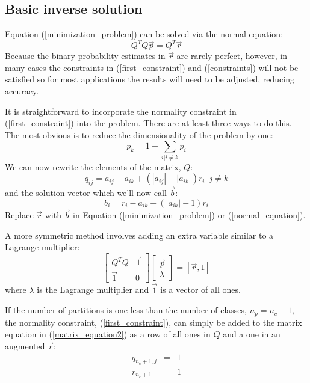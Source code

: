 \documentclass{article}
\begin{document}
\subsection{Basic inverse solution}

Equation (\ref{minimization_problem}) can be solved via the normal
equation:
\begin{equation}
	Q^T Q \vec p = Q^T \vec r
	\label{normal_equation}
\end{equation}
Because the binary probability estimates in $\vec r$ are rarely perfect, however,
in many cases the constraints in (\ref{first_constraint}) and (\ref{constraints}) will not be satisfied 
so for most applications the results will need to be adjusted, reducing accuracy.

It is straightforward to incorporate the normality constraint in (\ref{first_constraint}) into the problem. There are at least three ways to do this. The most
obvious is to reduce the dimensionality of the problem by one:
\begin{equation}
	p_k = 1 - \sum_{i|i \ne k} p_i
\end{equation}
We can now rewrite the elements of the matrix, $Q$:
\begin{equation}
	q_{ij} = a_{ij} - a_{ik} + (|a_{ij}|-|a_{ik}|)r_i | ~ j \ne k
\end{equation}
and the solution vector which we'll now call $\vec b$:
\begin{equation}
	b_i = r_i - a_{ik} + (|a_{ik}| - 1) r_i
\end{equation}
Replace $\vec r$ with $\vec b$ in Equation (\ref{minimization_problem}) or (\ref{normal_equation}).

A more symmetric method involves adding an extra variable similar to
a Lagrange multiplier:
\begin{equation}
	\begin{bmatrix}
		Q^T Q & \vec 1 \\
		\vec 1 & 0
	\end{bmatrix}
	\begin{bmatrix}
		\vec p\\
		\lambda
	\end{bmatrix}
	= [\vec r, 1]
\end{equation}
where $\lambda$ is the Lagrange multiplier and $\vec 1$ is a vector of all ones.

If the number of partitions is one less than the number of classes, $n_p=n_c-1$,
the normality constraint, (\ref{first_constraint}), can simply be added to the 
matrix equation in (\ref{matrix_equation2}) as a row of all ones in $Q$ and a one in an augmented $\vec r$:
\begin{eqnarray}
	q_{n_c+1,j} & = & 1 \\
	r_{n_c+1} & = & 1
\end{eqnarray}
\end{document}

